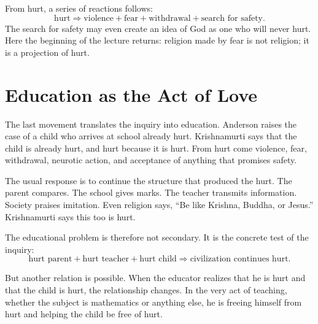 From hurt, a series of reactions follows:
\begin{equation}
\text{hurt}
\Rightarrow
\text{violence}+\text{fear}+\text{withdrawal}+\text{search for safety}.
\end{equation}
The search for safety may even create an idea of God as one who will never hurt. Here the beginning of the lecture returns: religion made by fear is not religion; it is a projection of hurt.

\section{Education as the Act of Love}

The last movement translates the inquiry into education. Anderson raises the case of a child who arrives at school already hurt. Krishnamurti says that the child is already hurt, and hurt because it is hurt. From hurt come violence, fear, withdrawal, neurotic action, and acceptance of anything that promises safety.

The usual response is to continue the structure that produced the hurt. The parent compares. The school gives marks. The teacher transmits information. Society praises imitation. Even religion says, ``Be like Krishna, Buddha, or Jesus.'' Krishnamurti says this too is hurt.

The educational problem is therefore not secondary. It is the concrete test of the inquiry:
\begin{equation}
\text{hurt parent}+\text{hurt teacher}+\text{hurt child}
\Rightarrow
\text{civilization continues hurt}.
\end{equation}

But another relation is possible. When the educator realizes that he is hurt and that the child is hurt, the relationship changes. In the very act of teaching, whether the subject is mathematics or anything else, he is freeing himself from hurt and helping the child be free of hurt.

